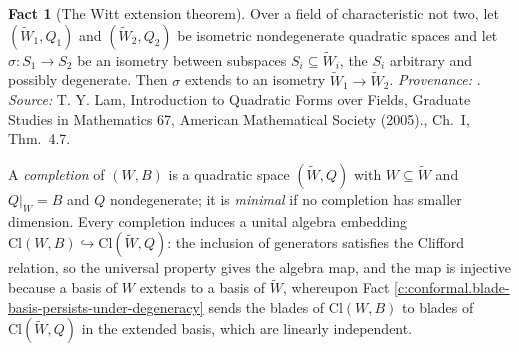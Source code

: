 \documentclass[11pt]{article}
\theoremstyle{definition}
\newtheorem{fact}[theorem]{Fact}
\theoremstyle{plain}
\providecommand{\Cl}{}\renewcommand{\Cl}{\mathrm{Cl}}
\begin{document}
\begin{fact}[The Witt extension theorem]\label{c:conformal.witt-extension-theorem}
Over a field of characteristic not two, let $(\widetilde W_1, Q_1)$ and $(\widetilde W_2, Q_2)$ be isometric nondegenerate quadratic spaces and let $\sigma : S_1 \to S_2$ be an isometry between subspaces $S_i \subseteq \widetilde W_i$, the $S_i$ arbitrary and possibly degenerate. Then $\sigma$ extends to an isometry $\widetilde W_1 \to \widetilde W_2$. \emph{Provenance:} \cite[Ch.~I, Thm.~4.7]{Lam2005}.
\emph{Source:} T. Y. Lam, Introduction to Quadratic Forms over Fields, Graduate Studies in Mathematics 67, American Mathematical Society (2005)., Ch.~I, Thm.~4.7.
\end{fact}

\label{c:note.conformal.setting-setup-2}
A \emph{completion} of $(W,B)$ is a quadratic space $(\widetilde W, Q)$ with $W \subseteq \widetilde W$ and $Q|_W = B$ and $Q$ nondegenerate; it is \emph{minimal} if no completion has smaller dimension. Every completion induces a unital algebra embedding $\Cl(W,B) \hookrightarrow \Cl(\widetilde W, Q)$: the inclusion of generators satisfies the Clifford relation, so the universal property gives the algebra map, and the map is injective because a basis of $W$ extends to a basis of $\widetilde W$, whereupon Fact \ref{c:conformal.blade-basis-persists-under-degeneracy} sends the blades of $\Cl(W,B)$ to blades of $\Cl(\widetilde W, Q)$ in the extended basis, which are linearly independent.
\end{document}
